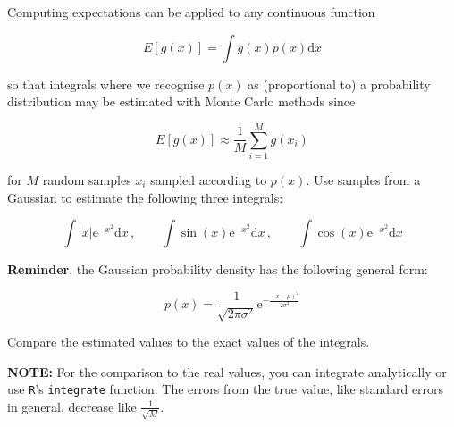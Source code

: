 \documentclass[
]{article}
\begin{document}
Computing expectations can be applied to any continuous function

\[E[g(x)] = \int g(x) p(x) \mathrm{d} x\]

so that integrals where we recognise \(p(x)\) as (proportional to) a
probability distribution may be estimated with Monte Carlo methods since

\[E[g(x)] \approx \frac{1}{M} \sum_{i=1}^{M} g(x_i) \]

for \(M\) random samples \(x_i\) sampled according to \(p(x)\). Use
samples from a Gaussian to estimate the following three integrals:

\[\int \vert x \vert \mathrm{e}^{-x^2} \mathrm{d} x \, , \qquad \int \sin(x) \mathrm{e}^{-x^2} \mathrm{d} x\, , \qquad \int \cos(x) \mathrm{e}^{-x^2} \mathrm{d} x\]

\textbf{Reminder}, the Gaussian probability density has the following
general form:

\[
p(x) = \frac{1}{\sqrt{2\pi\sigma^2}} \mathrm{e}^{- \frac{(x - \mu)^ 2}{ 2\sigma^2} }
\]

Compare the estimated values to the exact values of the integrals.

\textbf{NOTE:} For the comparison to the real values, you can integrate
analytically or use \texttt{R}'s \texttt{integrate} function. The errors
from the true value, like standard errors in general, decrease like
\(\frac{1}{\sqrt{M}}\).
\end{document}
